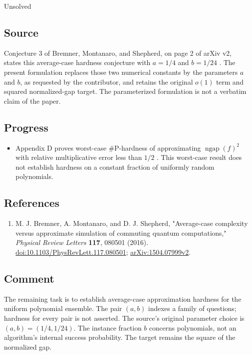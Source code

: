 Unsolved

\subsection*{Source}

Conjecture 3 of Bremner, Montanaro, and Shepherd, on page 2 of arXiv v2,
states this average-case hardness conjecture with $a=1/4$ and $b=1/24$
.
The present formulation replaces those two numerical constants by the
parameters $a$ and $b$, as requested by the contributor, and retains the
original $o(1)$ term and squared normalized-gap target.
The parameterized formulation is not a verbatim claim of the paper.

\subsection*{Progress}

\begin{itemize}
  \item Appendix D proves worst-case $\#\mathrm{P}$-hardness of approximating
$\operatorname{ngap}(f)^2$ with relative multiplicative error less than $1/2$
.
This worst-case result does not establish hardness on a constant fraction
of uniformly random polynomials.
\end{itemize}

\subsection*{References}

\begin{enumerate}[label={},leftmargin=4.8em,labelsep=0.5em]
  \footnotesize
  \item[\textup{[BMS16]}]\label{ref:bms-poly-source}
  M. J. Bremner, A. Montanaro, and D. J. Shepherd,
"Average-case complexity versus approximate simulation of commuting quantum computations,"
\emph{Physical Review Letters} \textbf{117}, 080501 (2016).
\href{https://doi.org/10.1103/PhysRevLett.117.080501}{doi:10.1103/PhysRevLett.117.080501};
\href{https://arxiv.org/abs/1504.07999v2}{arXiv:1504.07999v2}.
\end{enumerate}

\subsection*{Comment}

The remaining task is to establish average-case approximation hardness
for the uniform polynomial ensemble. The pair $(a,b)$ indexes a family of
questions; hardness for every pair is not asserted. The source's original
parameter choice is $(a,b)=(1/4,1/24)$.
The instance fraction $b$ concerns polynomials, not an algorithm's internal
success probability. The target remains the square of the normalized gap.

